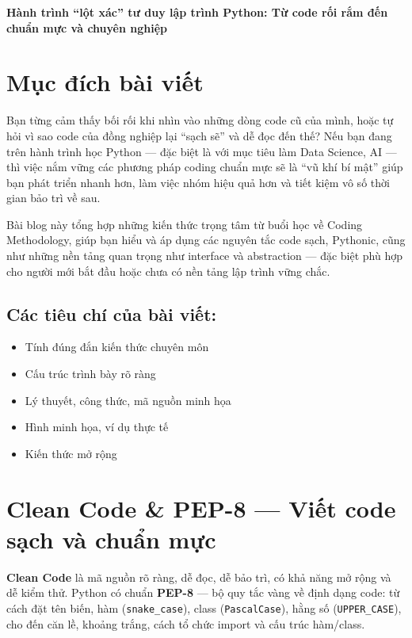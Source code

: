 \begin{center}
    \Large\textbf{Hành trình ``lột xác'' tư duy lập trình Python: Từ code rối rắm đến chuẩn mực và chuyên nghiệp}
\end{center}

\section{Mục đích bài viết}
Bạn từng cảm thấy bối rối khi nhìn vào những dòng code cũ của mình, hoặc tự hỏi vì sao code của đồng nghiệp lại ``sạch sẽ'' và dễ đọc đến thế? Nếu bạn đang trên hành trình học Python --- đặc biệt là với mục tiêu làm Data Science, AI --- thì việc nắm vững các phương pháp coding chuẩn mực sẽ là ``vũ khí bí mật'' giúp bạn phát triển nhanh hơn, làm việc nhóm hiệu quả hơn và tiết kiệm vô số thời gian bảo trì về sau.

Bài blog này tổng hợp những kiến thức trọng tâm từ buổi học về Coding Methodology, giúp bạn hiểu và áp dụng các nguyên tắc code sạch, Pythonic, cũng như những nền tảng quan trọng như interface và abstraction --- đặc biệt phù hợp cho người mới bắt đầu hoặc chưa có nền tảng lập trình vững chắc.

\subsection*{Các tiêu chí của bài viết:}
\begin{itemize}[leftmargin=2em]
    \item Tính đúng đắn kiến thức chuyên môn
    \item Cấu trúc trình bày rõ ràng
    \item Lý thuyết, công thức, mã nguồn minh họa
    \item Hình minh họa, ví dụ thực tế
    \item Kiến thức mở rộng
\end{itemize}

\section{Clean Code \& PEP-8 --- Viết code sạch và chuẩn mực}
\textbf{Clean Code} là mã nguồn rõ ràng, dễ đọc, dễ bảo trì, có khả năng mở rộng và dễ kiểm thử. Python có chuẩn \textbf{PEP-8} --- bộ quy tắc vàng về định dạng code: từ cách đặt tên biến, hàm (\texttt{snake\_case}), class (\texttt{PascalCase}), hằng số (\texttt{UPPER\_CASE}), cho đến căn lề, khoảng trắng, cách tổ chức import và cấu trúc hàm/class.

